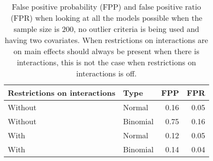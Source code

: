 \begin{longtable}{llrr}
\caption{False positive probability (FPP) and false positive ratio (FPR) when looking at all the models possible when the sample size is 200, no outlier criteria is being used and having two covariates. When restrictions on interactions are on main effects should always be present when there is interactions, this is not the case when restrictions on interactions is off.} \\ 
\label{tab:fullBC}
  \hline
Restrictions on interactions & Type & FPP & FPR \\ 
  \hline
Without & Normal & 0.16 & 0.05 \\ 
  Without & Binomial & 0.75 & 0.16 \\ 
  With & Normal & 0.12 & 0.05 \\ 
  With & Binomial & 0.14 & 0.04 \\ 
   \hline
\hline
\end{longtable}
